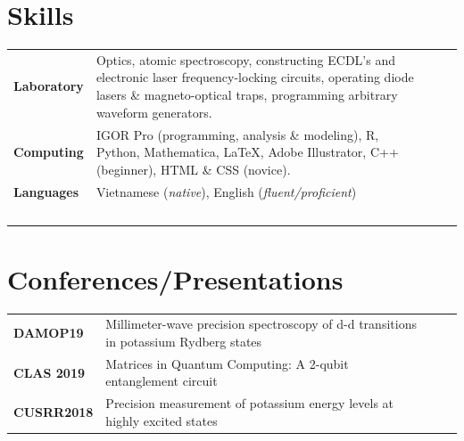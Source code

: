 \documentclass[a4paper, 10.5pt]{article}
\begin{document}
	\section*{\normalsize{{\color{colby}Skills}}}
		\begin{tabular}{lp{13.5cm}lp{8in}}
			
			\textbf{Laboratory} & Optics, atomic spectroscopy, constructing ECDL's and electronic laser frequency-locking circuits, operating diode lasers \& magneto-optical traps, programming arbitrary waveform generators.\\
			
			\textbf{Computing} & IGOR Pro (programming, analysis \& modeling), R, Python, Mathematica, \LaTeX{}, Adobe Illustrator, C++ (beginner), HTML \& CSS (novice).\\
			
			
			\textbf{Languages} & Vietnamese (\textit{native}), English (\textit{fluent/proficient})\\
			$\,$
		\end{tabular}
	
	\section*{\normalsize{{\color{colby}Conferences/Presentations}}}
		\begin{tabular}{lp{13.5cm}lp{8in}}
			\textbf{DAMOP19} & Millimeter-wave precision spectroscopy of d-d transitions in potassium Rydberg states \\
			\textbf{CLAS 2019} & Matrices in Quantum Computing: A 2-qubit entanglement circuit\\
			\textbf{CUSRR2018} & Precision measurement of potassium energy levels at highly excited states\\
		\end{tabular}
	
\end{document}
